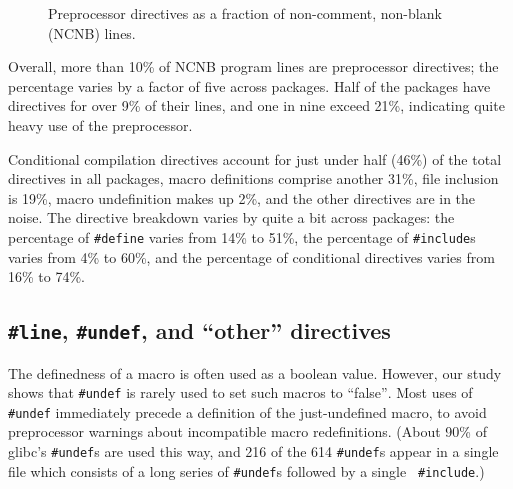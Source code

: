 \documentclass[11pt]{article}
\begin{document}

\begin{figure}
\centerline{}
\caption{Preprocessor directives as a fraction of non-comment,
  non-blank (NCNB) lines.}
\label{fig:directives-breakdown}
\end{figure}

Overall, more than 10\% of NCNB program lines are preprocessor directives;
the percentage varies by a factor of five across packages.  Half of
the packages
have directives for over 9\% of their lines, and one in nine exceed 21\%,
indicating quite heavy use of the preprocessor.



Conditional compilation directives account for just under half (46\%) of
the total directives in all packages, macro definitions comprise another
31\%, file inclusion is 19\%, macro undefinition makes up 2\%, and the
other directives are in the noise.  The directive breakdown varies by quite
a bit across packages: the percentage of {\tt \#define} varies from 14\% to
51\%, the percentage of {\tt \#include}s varies from 4\% to 60\%, and the
percentage of conditional directives varies from 16\% to 74\%.



\subsection{{\tt \#line}, {\tt \#undef}, and ``other'' directives}

The definedness of a macro is often used as a boolean value.  However, our
study shows that {\tt \#undef} is rarely used to set such macros to
``false''$\!$.  Most uses of {\tt \#undef} immediately precede a definition of
the just-undefined macro, to avoid preprocessor warnings about incompatible
macro redefinitions.  (About 90\% of glibc's {\tt \#undef}s are used this
way, and 216 of the 614 {\tt \#undef}s appear in a single file which
consists of a long series of {\tt \#undef}s followed by a single {\tt
\#include}.)
\end{document}
